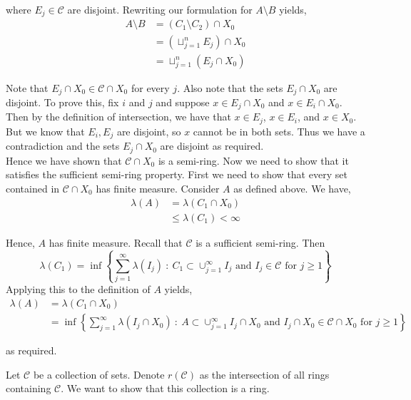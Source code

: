\documentclass[12pt]{article}
\newenvironment{problem}[2][Problem]{\begin{trivlist}
\item[\hskip \labelsep {\bfseries #1}\hskip \labelsep {\bfseries #2.}]}{\end{trivlist}}
\begin{document}
where $E_j \in \mathcal{C}$ are disjoint. Rewriting our formulation for $A \setminus B$ yields,
\begin{align*}
A \setminus B &= (C_1 \setminus C_2) \cap X_0\\
&= (\sqcup_{j=1}^n E_j) \cap X_0\\
&= \sqcup_{j=1}^n (E_j \cap X_0)
\end{align*}

Note that $E_j \cap X_0 \in \mathcal{C} \cap X_0$ for every $j$. Also note that the sets $E_j \cap X_0$ are disjoint. To prove this, fix $i$ and $j$ and suppose $x \in E_j \cap X_0$ and $x \in E_i \cap X_0$. Then by the definition of intersection, we have that $x \in E_j$, $x \in E_i$, and $x \in X_0$. But we know that $E_i, E_j$ are disjoint, so $x$ cannot be in both sets. Thus we have a contradiction and the sets $E_j \cap X_0$ are disjoint as required.\\

Hence we have shown that $\mathcal{C} \cap X_0$ is a semi-ring. Now we need to show that it satisfies the sufficient semi-ring property. First we need to show that every set contained in $\mathcal{C} \cap X_0$ has finite measure. Consider $A$ as defined above. We have,
\begin{align*}
\lambda(A) &= \lambda(C_1 \cap X_0)\\
&\leq \lambda(C_1) < \infty
\end{align*}

Hence, $A$ has finite measure. Recall that $\mathcal{C}$ is a sufficient semi-ring. Then $$\lambda(C_1) = \inf \left\{ \sum_{j=1}^{\infty} \lambda(I_j) \ : \ C_1 \subset \cup_{j=1}^{\infty}I_j \text{ and } I_j \in \mathcal{C} \text{ for } j \geq 1 \right\}$$ Applying this to the definition of $A$ yields,
\begin{align*}
\lambda(A) &= \lambda(C_1 \cap X_0)\\
&= \inf \left\{ \sum_{j=1}^{\infty} \lambda(I_j \cap X_0) \ : \ A \subset \cup_{j=1}^{\infty} I_j \cap X_0 \text{ and } I_j \cap X_0 \in \mathcal{C} \cap X_0 \text{ for } j \geq 1 \right\}
\end{align*} 

as required.

\begin{problem}{6}
\end{problem}

Let $\mathcal{C}$ be a collection of sets. Denote $r(\mathcal{C})$ as the intersection of all rings containing $\mathcal{C}$. We want to show that this collection is a ring.\\
\end{document}
